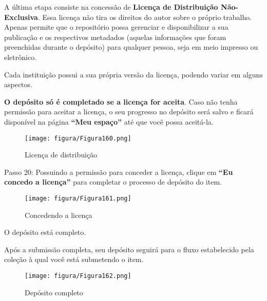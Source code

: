 \documentclass[12pt,hidelinks]{article}
\begin{document}
    A última etapa consiste na concessão de \textbf{Licença de Distribuição Não-Exclusiva}. Essa licença não tira os direitos do autor sobre o próprio trabalho. Apenas permite que o repositório possa gerenciar e disponibilizar a sua publicação e os respectivos metadados (aquelas informações que foram preenchidas durante o depósito) para qualquer pessoa, seja em meio impresso ou eletrônico.
    
    \singlespacing
    
    Cada instituição possui a sua própria versão da licença, podendo variar em alguns aspectos.
    
    \singlespacing
    
    \textbf{O depósito só é completado se a licença for aceita}. Caso não tenha permissão para aceitar a licença, o seu progresso no depósito será salvo e ficará disponível na página \textbf{“Meu espaço”} até que você possa aceitá-la.
    
\newpage

    \begin{figure}[!htp]
                \centering
                \texttt{[image: figura/Figura160.png]}
                \caption{Licença de distribuição}
            \label{Rotulo}
        \end{figure}
    
    Passo 20: Possuindo a permissão para conceder a licença, clique em \textbf{“Eu concedo a licença”} para completar o processo de depósito do item.

    \begin{figure}[!htp]
                \centering
                \texttt{[image: figura/Figura161.png]}
                \caption{Concedendo a licença}
            \label{Rotulo}
        \end{figure}
    
    O depósito está completo.
    
    \singlespacing
    
    Após a submissão completa, seu depósito seguirá para o fluxo estabelecido pela coleção à qual você está submetendo o item.
    
\newpage
    
    \begin{figure}[!htp]
                \centering
                \texttt{[image: figura/Figura162.png]}
                \caption{Depósito completo}
            \label{Rotulo}
        \end{figure}
    
\end{document}
